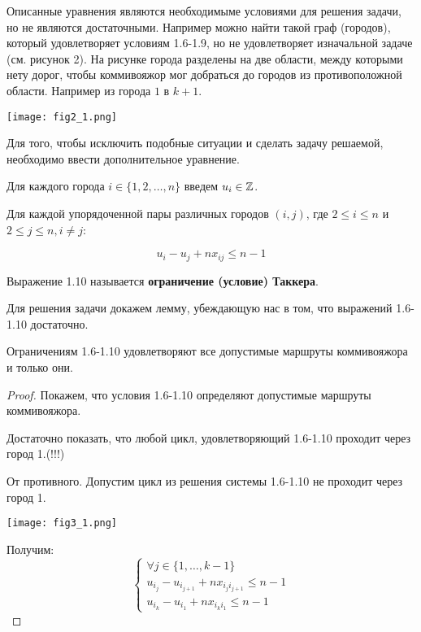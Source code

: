 \documentclass[../../main.tex]{subfiles}
\begin{document}
\begin{example}
    Описанные уравнения являются необходимыме условиями для решения
    задачи, но не являются достаточными. Например можно найти такой граф
    (городов), который удовлетворяет условиям 1.6-1.9, но не удовлетворяет
    изначальной задаче (см. рисунок 2). На рисунке города разделены на две
    области, между которыми нету дорог, чтобы коммивояжор мог добраться до
    городов из противоположной области. Например из города $1$ в $k+1$.

    \texttt{[image: fig2\_1.png]}

    Для того, чтобы исключить подобные ситуации и сделать задачу решаемой,
    необходимо ввести дополнительное уравнение.
    
    Для каждого города $i \in \{1,2, \dots, n\}$ введем $u_i \in \mathbb{Z}$.

    Для каждой упорядоченной пары различных городов $(i,j)$, где
    $2 \le i \le n$ и $2 \le j \le n, i \neq j$:

    \begin{equation}
        u_i - u_j + nx_{ij} \le n - 1
    \end{equation}

    Выражение 1.10 называется \textbf{ограничение (условие) Таккера}.

    Для решения задачи докажем лемму, убеждающую нас в том, что выражений
    1.6-1.10 достаточно.

    \begin{lemma}
        Ограничениям 1.6-1.10 удовлетворяют все допустимые маршруты коммивояжора
        и только они.
    \end{lemma}
    \begin{proof}
        Покажем, что условия 1.6-1.10 определяют допустимые маршруты
        коммивояжора.

        Достаточно показать, что любой цикл, удовлетворяющий 1.6-1.10
        проходит через город 1.(!!!)

        От противного. Допустим цикл из решения системы 1.6-1.10 не проходит
        через город 1.

        \texttt{[image: fig3\_1.png]}
        
        Получим:
        \begin{equation*}
            \begin{cases}
                \forall j \in \{1, \dots, k-1\} \\
                u_{i_j} - u_{i_{j+1}} + nx_{i_ji_{j+1}} \le n-1 \\
                u_{i_k} - u_{i_1} + nx_{i_ki_1} \le n-1
            \end{cases}
        \end{equation*}


\end{proof}
\end{example}
\end{document}
